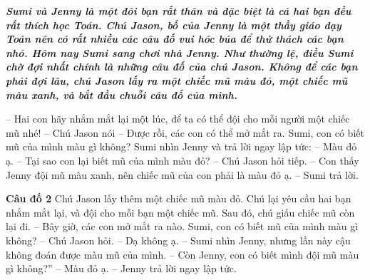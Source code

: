 	\textbf{\textit{Sumi và Jenny là một đôi bạn rất  thân và đặc biệt là cả hai bạn đều rất thích học  Toán. Chú Jason, bố của Jenny là một thầy giáo dạy Toán nên có rất nhiều các câu đố vui hóc búa để thử thách các  bạn nhỏ. 
	\vskip 0.2cm
	Hôm nay Sumi sang chơi nhà Jenny. Như thường lệ, điều Sumi chờ đợi nhất chính là những câu đố của chú Jason.
	\vskip 0.2cm
	Không để các bạn phải đợi lâu, chú Jason lấy ra một chiếc mũ màu đỏ, một chiếc mũ màu xanh, và bắt đầu chuỗi câu đố của mình.}}	

\begin{adjustwidth}{120pt}{0pt}
	-- Hai con hãy nhắm mắt lại một lúc, để ta có thể đội cho mỗi người một chiếc mũ nhé! -- Chú Jason nói
	-- Được rồi, các con có thể mở mắt ra. Sumi, con có biết mũ của mình màu gì không?
	\vskip 0.1cm
	Sumi nhìn Jenny và trả lời ngay lập tức:
	\vskip 0.1cm
	-- Màu đỏ ạ.
	\vskip 0.1cm
	-- Tại sao con lại biết mũ của mình màu đỏ? -- Chú Jason hỏi tiếp.
	\vskip 0.1cm
	-- Con thấy Jenny đội mũ màu xanh, nên chiếc mũ của con phải là màu đỏ ạ. -- Sumi trả lời.
\end{adjustwidth}
	\textbf{Câu đố 2}
	\vskip 0.1cm
	Chú Jason lấy thêm một chiếc mũ màu đỏ. Chú lại yêu cầu hai bạn nhắm mắt lại, và đội cho mỗi bạn một chiếc mũ. Sau đó, chú giấu chiếc mũ còn lại đi.
	\vskip 0.1cm
	-- Bây giờ, các con mở mắt ra nào. Sumi, con có biết mũ của mình màu gì không? -- Chú  Jason hỏi.
	\vskip 0.1cm
	-- Dạ không ạ. -- Sumi nhìn Jenny, nhưng lần này cậu không đoán được màu mũ của mình.
	\vskip 0.1cm
	-- Còn Jenny, con có biết mình đội mũ màu  gì không?”
	\vskip 0.1cm
	-- Màu đỏ ạ. -- Jenny trả lời ngay lập tức.
	\vskip 0.1cm

